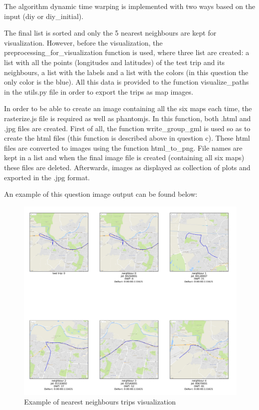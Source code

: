 \documentclass[12pt]{article}
\begin{document}
	The algorithm dynamic time warping is implemented with two ways based on the input (diy or diy\_initial). 
	
	The final list is sorted and only the 5 nearest neighbours are kept for visualization. However, before the visualization, the preprocessing\_for\_visualization function is used, where three list are created: a list with all the points (longitudes and latitudes) of the test trip and its neighbours, a list with the labels and a list with the colors (in this question the only color is the blue). All this data is provided to the function visualize\_paths in the utils.py file in order to export the trips as map images.
	
	In order to be able to create an image containing all the six maps each time, the rasterize.js file is required as well as phantomjs. In this function, both .html and .jpg files are created. First of all, the function write\_group\_gml is used so as to create the html files (this function is described above in question c). These html files are converted to images using the function html\_to\_png. File names are kept in a list and when the final image file is created (containing all six maps) these files are deleted. Afterwards, images as displayed as collection of plots and exported in the .jpg format.
	
	An example of this question image output can be found below:
	
	\begin{figure} [H]
		\begin{center}
			\includegraphics [scale = 0.50] {question2a1example.jpg}
			\caption{Example of nearest neighbours trips visualization}
		\end{center}
	\end{figure} 
	
\end{document}
